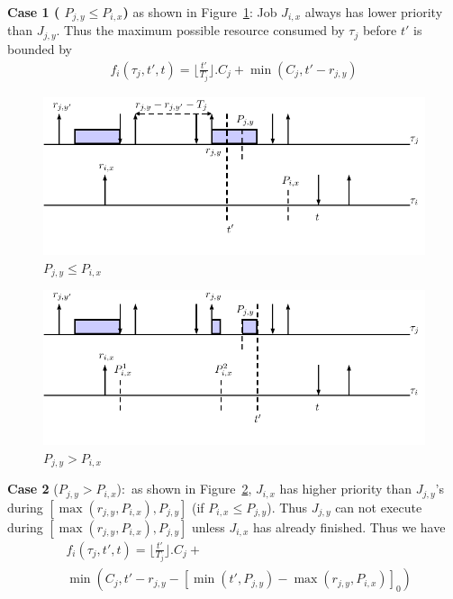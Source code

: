 \textbf{Case 1 ( $P_{j,y}\leq P_{i,x}$)} as shown in  Figure~\ref{fig:case1}: Job $J_{i,x}$ always has lower priority than  $J_{j,y}$. Thus   the maximum possible resource consumed by $\tau_{j}$  before $t'$ is  bounded by
	\begin{align*}
		f_i(\tau_j,t',t)=\lfloor \frac{t'}{T_j}\rfloor.C_j +\min\left(C_j,t'-r_{j,y}\right)
	\end{align*}
 

\begin{figure}[h!]
 \centering
\includegraphics[scale=0.7]{Figure/C1}  
\caption{$ P_{j,y}\leq P_{i,x}$}
  \label{fig:case1}
\end{figure}






\begin{figure}[h!]
 \centering
\includegraphics[scale=0.7]{Figure/C2}  
\caption{$P_{j,y}> P_{i,x}$}
  \label{fig:case2}
\end{figure}

\textbf{Case 2} ($P_{j,y}> P_{i,x}$):~as shown in  Figure~\ref{fig:case2}, $J_{i,x}$ has higher priority than $J_{j,y}$'s  during $[\max(r_{j,y},P_{i,x}),P_{j,y}]$ (if $P_{i,x}\leq P_{j,y}$). Thus  $J_{j,y}$ can not execute  during $[\max(r_{j,y},P_{i,x}),P_{j,y}]$ unless $J_{i,x}$ has already finished. Thus we have
	\begin{align*}
		&f_i(\tau_j,t',t)=\lfloor \frac{t'}{T_j}\rfloor.C_j +
\\&\min\left(C_j,\!t'\!-\!r_{j,y}\!-\!\left[\min(t'\!,\!P_{j,y})\!-\!\max(r_{j,y},\!P_{i,x})\right]_0\right)
		\end{align*}




